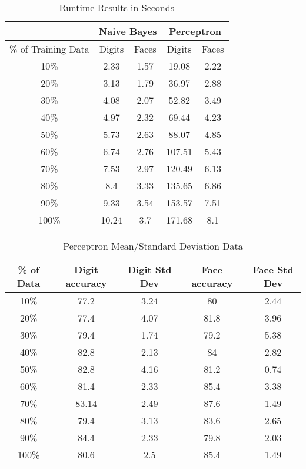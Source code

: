 \documentclass{article}
\begin{document}
\begin{table}[H]
	\centering
	\caption{Runtime Results in Seconds}
	\begin{tabular}{|*{5}{c|}|}
		\hline
		& \multicolumn{2}{c|}{Naive Bayes} & \multicolumn{2}{c|}{Perceptron}  \\
		\hline
		\% of Training Data & Digits & Faces & Digits & Faces \\
		\hline
		10\%  & 2.33  & 1.57  & 19.08 & 2.22 \\
		20\%  & 3.13  & 1.79  & 36.97 & 2.88 \\
		30\%  & 4.08  & 2.07  & 52.82 & 3.49 \\
		40\%  & 4.97  & 2.32  & 69.44 & 4.23 \\
		50\%  & 5.73  & 2.63  & 88.07 & 4.85 \\
		60\%  & 6.74  & 2.76  & 107.51 & 5.43 \\
		70\%  & 7.53  & 2.97  & 120.49 & 6.13 \\
		80\%  & 8.4   & 3.33  & 135.65 & 6.86 \\
		90\%  & 9.33  & 3.54  & 153.57 & 7.51 \\
		100\% & 10.24 & 3.7   & 171.68 & 8.1 \\
		\hline
	\end{tabular}%
\end{table}%
\begin{table}[H]
	\centering
	\caption{Perceptron Mean/Standard Deviation Data}
	\begin{tabular}{|*{5}{c|}|}
		\hline
		\% of Data & Digit accuracy & Digit Std Dev & Face accuracy & Face Std Dev \\
		\hline
		10\%  & 77.2  & 3.24  & 80    & 2.44 \\
		20\%  & 77.4  & 4.07  & 81.8  & 3.96 \\
		30\%  & 79.4  & 1.74  & 79.2  & 5.38 \\
		40\%  & 82.8  & 2.13  & 84    & 2.82 \\
		50\%  & 82.8  & 4.16  & 81.2  & 0.74 \\
		60\%  & 81.4  & 2.33  & 85.4  & 3.38 \\
		70\%  & 83.14 & 2.49  & 87.6  & 1.49 \\
		80\%  & 79.4  & 3.13  & 83.6  & 2.65 \\
		90\%  & 84.4  & 2.33  & 79.8  & 2.03 \\
		100\% & 80.6  & 2.5   & 85.4  & 1.49 \\
		\hline
	\end{tabular}%
\end{table}%
\end{document}
